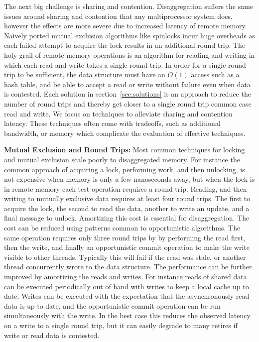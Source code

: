 The next big challenge is sharing and contention. Disaggregation suffers the
same issues around sharing and contention that any multiprocessor system does,
however the effects are more severe due to increased latency of remote memory.
Naively ported mutual exclusion algorithms like spinlocks incur huge overheads
as each failed attempt to acquire the lock results in an additional round trip.
The holy grail of remote memory operations is an algorithm for reading and
writing in which each read and write takes a single round trip. In order for a
single round trip to be sufficient, the data structure must have an $O(1)$
access such as a hash table, and be able to accept a read or write without
failure even when data is contested. Each solution in
section~\ref{sec:solutions} is an approach to reduce the number of round trips
and thereby get closer to a single round trip common case read and write.  We
focus on techniques to alleviate sharing and contention latency. These
techniques often come with tradeoffs, such as additional bandwidth, or memory
which complicate the evaluation of effective techniques.

\textbf{Mutual Exclusion and Round Trips:} 
Most common techniques for locking and mutual exclusion scale poorly to
disaggregated memory. For instance the common approach of acquiring a lock,
performing work, and then unlocking, is not expensive when memory is only a few
nanoseconds away, but when the lock is in remote memory each test operation
requires a round trip.  Reading, and then writing to mutually exclusive data
requires at least four round trips. The first to acquire the lock, the second to
read the data, another to write an update, and a final message to unlock.
Amortizing this cost is essential for disaggregation. The cost can be reduced
using patterns common to opportunistic algorithms. The same operation requires
only three round trips by by performing the read first, then the write, and
finally an opportunistic commit operation to make the write visible to other
threads. Typically this will fail if the read was stale, or another thread
concurrently wrote to the data structure. The performance can be further
improved by amortizing the reads and writes. For instance reads of shared data
can be executed periodically out of band with writes to keep a local cache up to
date.  Writes can be executed with the expectation that the asynchronously read
data is up to date, and the opportunistic commit operation can be run
simultaneously with the write. In the best case this reduces the observed
latency on a write to a single round trip, but it can easily degrade to many
retires if write or read data is contested. 

